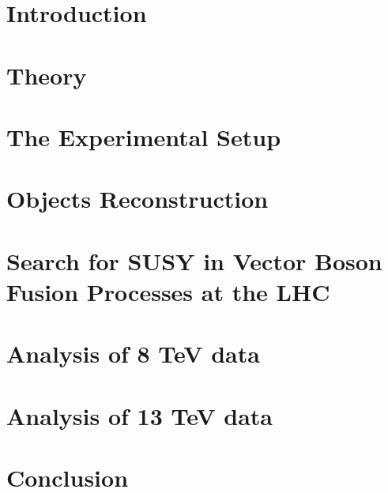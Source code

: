 \documentclass[
twoside=false,
headsepline,     %
headings=normal,
open=any,
numbers=noenddot, %
numbering %
]{scrreprt} %
\begin{document}
\setcounter{page}{1}
\tableofcontents

\cleardoublepage

\setcounter{page}{1}


\chapter{Introduction}
\label{sec:introduction}

\cleardoublepage

\chapter{Theory}
\label{sec:theory}

\cleardoublepage

\chapter{The Experimental Setup}
\label{sec:detector}

\cleardoublepage

\chapter{Objects Reconstruction}
\label{sec:obj_reco}

\cleardoublepage

\chapter{Search for SUSY in Vector Boson Fusion Processes at the LHC}
\label{sec:VBFSUSY}

\cleardoublepage

\chapter{Analysis of 8 TeV data}
\label{sec:analysis}

\cleardoublepage

\chapter{Analysis of 13 TeV data}
\label{sec:13TeVanalysis}

\cleardoublepage

\chapter{Conclusion}
\label{sec:conclusion}

\cleardoublepage
\end{document}
